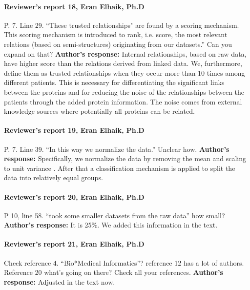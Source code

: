 \documentclass{bmcart}
\begin{document}
\paragraph {Reviewer's report 18, Eran Elhaik, Ph.D}
P. 7. Line 29. “These trusted relationships" are found by a scoring mechanism. This scoring mechanism is introduced to rank, i.e. score, the most relevant relations (based on semi-structures) originating from our datasets.” Can you expand on that?
\newline \textbf{Author's response:}
Internal relationships, based on raw data, have higher score than the relations derived from linked data. We, furthermore, define them as trusted relationships when they occur more than 10 times among different patients. This is necessary for differentiating the significant links between the proteins and for reducing the noise of the relationships between the patients through the added protein information. The noise comes from external knowledge sources where potentially all proteins can be related.


\paragraph {Reviewer's report 19, Eran Elhaik, Ph.D}
P. 7. Line 39. “In this way we normalize the data.” Unclear how.
\newline \textbf{Author's response:}
Specifically, we normalize the data by removing the mean and scaling to unit variance \cite{14}. After that a classification mechanism is applied to split the data into relatively equal groups.

\paragraph {Reviewer's report 20, Eran Elhaik, Ph.D}
P 10, line 58. “took some smaller datasets from the raw data” how small?
\newline \textbf{Author's response:}
It is 25\%. We added this information in the text.


\paragraph {Reviewer's report 21, Eran Elhaik, Ph.D}
Check reference 4. “Bio*Medical Informatics”? reference 12 has a lot of authors. Reference 20 what’s going on there? Check all your references.
\newline \textbf{Author's response:}
Adjusted in the text now.
\end{document}

